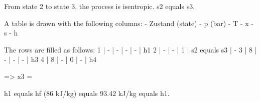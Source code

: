 From state 2 to state 3, the process is isentropic.  
s2 equals s3.  

A table is drawn with the following columns:  
- Zustand (state)  
- p (bar)  
- T  
- x  
- s  
- h  

The rows are filled as follows:  
1 | - | - | - | - | h1  
2 | - | - | 1 | s2 equals s3 | -  
3 | 8 | - | - | - | h3  
4 | 8 | - | 0 | - | h4  

=> x3 =  

h1 equals hf (86 kJ/kg) equals 93.42 kJ/kg equals h1.